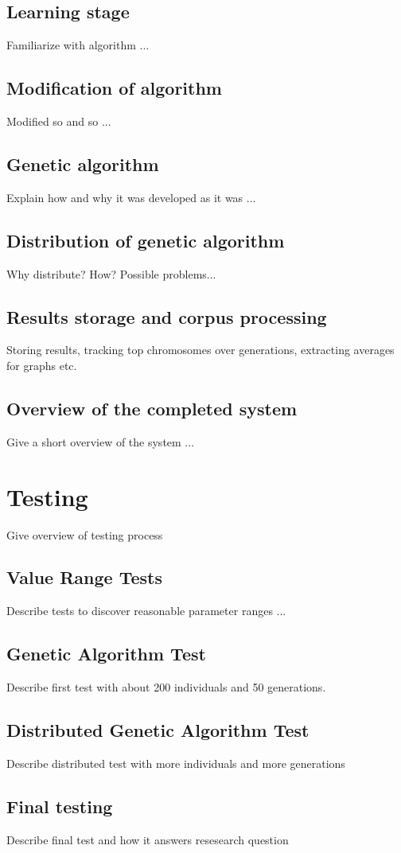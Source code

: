 \subsection{Learning stage}
Familiarize with algorithm ...

\subsection{Modification of algorithm}
Modified so and so ...

\subsection{Genetic algorithm}
Explain how and why it was developed as it was ...

\subsection{Distribution of genetic algorithm}
Why distribute? How? Possible problems...

\subsection{Results storage and corpus processing}
Storing results, tracking top chromosomes over generations, extracting averages for graphs etc.

\subsection{Overview of the completed system}
Give a short overview of the system ...

\section{Testing}
\label{Testing}
Give overview of testing process

\subsection{Value Range Tests}
Describe tests to discover reasonable parameter ranges ...

\subsection{Genetic Algorithm Test}
Describe first test with about 200 individuals and 50 generations.

\subsection{Distributed Genetic Algorithm Test}
Describe distributed test with more individuals and more generations

\subsection{Final testing}
Describe final test and how it answers resesearch question
